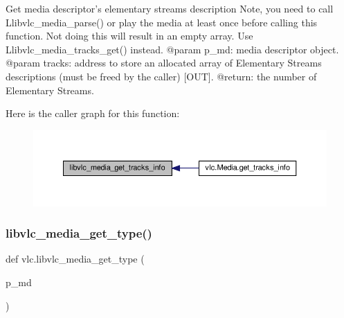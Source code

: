 \begin{DoxyVerb}Get media descriptor's elementary streams description
Note, you need to call L{libvlc_media_parse}() or play the media at least once
before calling this function.
Not doing this will result in an empty array.
\deprecated Use L{libvlc_media_tracks_get}() instead.
@param p_md: media descriptor object.
@param tracks: address to store an allocated array of Elementary Streams descriptions (must be freed by the caller) [OUT].
@return: the number of Elementary Streams.
\end{DoxyVerb}
 Here is the caller graph for this function\+:
\nopagebreak
\begin{figure}[H]
\begin{center}
\leavevmode
\includegraphics[width=350pt]{namespacevlc_ac5660b2bf617ac8dfd1ea85a31a42b66_icgraph}
\end{center}
\end{figure}
\mbox{\label{namespacevlc_a0c521348122d78764b8a4e7cae989a7f}} 
\subsubsection{\texorpdfstring{libvlc\+\_\+media\+\_\+get\+\_\+type()}{libvlc\_media\_get\_type()}}
{\footnotesize\ttfamily def vlc.\+libvlc\+\_\+media\+\_\+get\+\_\+type (\begin{DoxyParamCaption}\item[{}]{p\+\_\+md }\end{DoxyParamCaption})}

